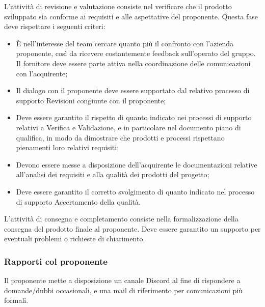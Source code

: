 L'attività di revisione e valutazione consiste nel verificare che il prodotto sviluppato sia conforme ai requisiti e alle aspettative del proponente. Questa fase deve rispettare i seguenti criteri:
\begin{itemize}
    \item È nell’interesse del team cercare quanto più il confronto con l’azienda proponente, così da ricevere costantemente feedback sull’operato del gruppo. Il fornitore deve essere parte attiva nella coordinazione delle comunicazioni con l’acquirente;
    \item Il dialogo con il proponente deve essere supportato dal relativo processo di supporto Revisioni congiunte con il proponente;
    \item Deve essere garantito il rispetto di quanto indicato nei processi di supporto relativi a Verifica e Validazione, e in particolare nel documento piano di qualifica, in modo da dimostrare che prodotti e processi rispettano pienamenti loro relativi requisiti;
    \item Devono essere messe a disposizione dell’acquirente le documentazioni relative all’analisi dei requisiti e alla qualità dei prodotti del progetto;
    \item Deve essere garantito il corretto svolgimento di quanto indicato nel processo di supporto Accertamento della qualità.
\end{itemize}

L'attività di consegna e completamento consiste nella formalizzazione della consegna del prodotto finale al proponente. Deve essere garantito un supporto per eventuali problemi o richieste di chiarimento.


\subsubsection{Rapporti col proponente}
Il proponente mette a disposizione un canale Discord al fine di rispondere a domande/dubbi occasionali, e una mail di riferimento per comunicazioni più formali.


